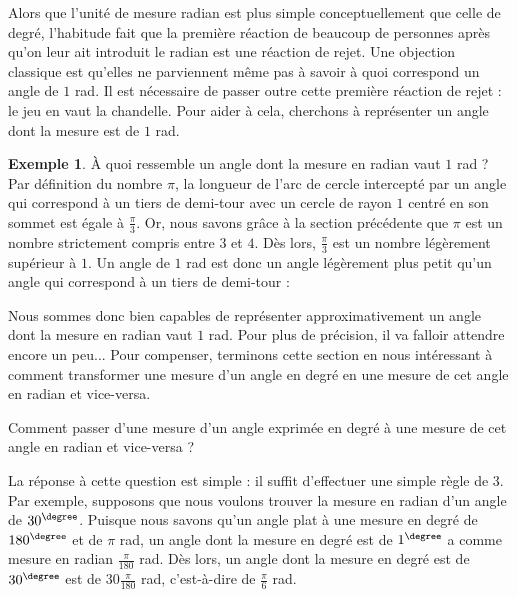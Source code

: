 \documentclass[a4paper,fontsize=13pt]{scrreprt}
\theoremstyle{plain}
\theoremstyle{definition}
\newtheorem{exe}[subsection]{Exemple}
\begin{document}
Alors que l'unité de mesure radian est plus simple conceptuellement que celle de degré, l'habitude fait que la première réaction de beaucoup de personnes après qu'on leur ait introduit le radian est une réaction de rejet. Une objection classique est qu'elles ne parviennent même pas à savoir à quoi correspond un angle de $1$ rad. Il est nécessaire de passer outre cette première réaction de rejet : le jeu en vaut la chandelle. Pour aider à cela, cherchons à représenter un angle dont la mesure est de $1$ rad.
\begin{exe}
\`A quoi ressemble un angle dont la mesure en radian vaut $1$ rad ? Par définition du nombre $\pi$, la longueur de l'arc de cercle intercepté par un angle qui correspond à un tiers de demi-tour avec un cercle de rayon $1$ centré en son sommet est égale à $\frac{\pi}{3}$. Or, nous savons grâce à la section précédente que $\pi$ est un nombre strictement compris entre $3$ et $4$. Dès lors, $\frac{\pi}{3}$ est un nombre légèrement supérieur à $1$. Un angle de $1$ rad est donc un angle légèrement plus petit qu'un angle qui correspond à un tiers de demi-tour :\\
\begin{center}
\end{center}
\end{exe}
Nous sommes donc bien capables de représenter approximativement un angle dont la mesure en radian vaut $1$ rad. Pour plus de précision, il va falloir attendre encore un peu... Pour compenser, terminons cette section en nous intéressant à comment transformer une mesure d'un angle en degré en une mesure de cet angle en radian et vice-versa.\\
\begin{center}
\begin{Large}
Comment passer d'une mesure d'un angle exprimée en degré à une mesure de cet angle en radian et vice-versa ?
\end{Large}
\end{center}
La réponse à cette question est simple : il suffit d'effectuer une simple règle de $3$. \\
Par exemple, supposons que nous voulons trouver la mesure en radian d'un angle de ${30}^{\degree}$. Puisque nous savons qu'un angle plat à une mesure en degré de ${180}^{\degree}$ et de $\pi$ rad, un angle dont la mesure en degré est de ${1}^{\degree}$ a comme mesure en radian $\frac{\pi}{180}$ rad. Dès lors, un angle dont la mesure en degré est de $30^{\degree}$ est de $30\frac{\pi}{180}$ rad, c'est-à-dire de $\frac{\pi}{6}$ rad.
\end{document}
